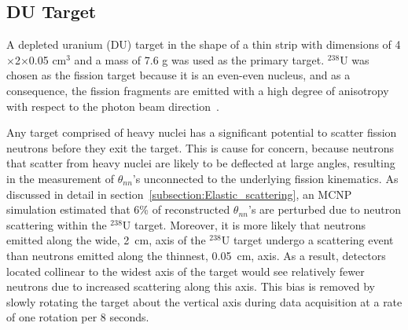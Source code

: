 \subsection{DU Target}
\label{subsection:targets}
A depleted uranium (DU) target in the shape of a thin strip with dimensions of 4$\times$2$\times$0.05 $\text{cm}^3$ and a mass of 7.6 g was used as the primary target.
$^{238}$U was chosen as the fission target because it is an even-even nucleus, and as a consequence, the fission fragments are emitted with a high degree of anisotropy with respect to the photon beam direction~\cite{1977FragAss}.

Any target comprised of heavy nuclei has a significant potential to scatter fission neutrons before they exit the target.
This is cause for concern, because neutrons that scatter from heavy nuclei are likely to be deflected at large angles, resulting in the measurement of $\theta_{nn}$'s unconnected to the underlying fission kinematics.
As discussed in detail in section~\ref{subsection:Elastic_scattering}, an MCNP simulation estimated that 6\% of reconstructed $\theta_{nn}$'s are perturbed due to neutron scattering within the $^{238}$U target.
Moreover, it is more likely that neutrons emitted along the wide, 2~cm, axis of the $^{238}$U target undergo a scattering event than neutrons emitted along the thinnest, 0.05~cm, axis.
As a result, detectors located collinear to the widest axis of the target would see relatively fewer neutrons due to increased scattering along this axis. 
This bias is removed by slowly rotating the target about the vertical axis during data acquisition at a rate of one rotation per 8 seconds.

